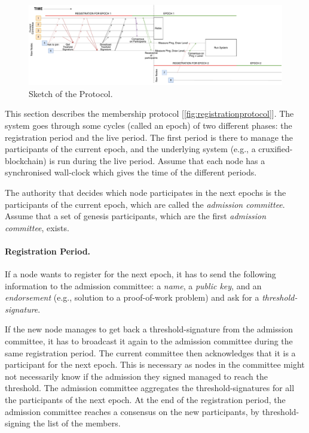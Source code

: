 \documentclass[a4paper,11pt,twoside,openright]{report}
\begin{document}
\begin{figure}
\centering
\includegraphics[width=700pt]{figures/Registrationprotocol}
\caption{Sketch of the Protocol.}
\label{fig:registrationprotocol}
\end{figure}

This section describes the membership protocol [\autoref{fig:registrationprotocol}].
The system goes through some cycles (called an epoch) of two different phases:
the registration period and the live period. The first period is there
to manage the participants of the current epoch, and the underlying system
(e.g., a cruxified-blockchain) is run during the live period. Assume
that each node has a synchronised wall-clock which gives the time of the
different periods.

The authority that decides which node participates in the next epochs is
the participants of the current epoch, which are called the \textit{admission
committee}. Assume that a set of genesis participants, which are the first
 \textit{admission committee}, exists.

\paragraph{Registration Period.}
If a node wants to register for the next epoch, it has to send the following
information to the admission committee: a \textit{name}, a \textit{public key}, and an
 \textit{endorsement} (e.g., solution to a proof-of-work problem) and ask for a
 \textit{threshold-signature}. 

If the new node manages to get back a threshold-signature from the admission
committee, it has to broadcast it again to the admission committee during the
same registration period. The current committee then acknowledges that it
is a participant for the next epoch. This is necessary as nodes in the
committee might not necessarily know if the admission they signed managed to
reach the threshold. The admission committee aggregates the
threshold-signatures for all the participants of the next epoch. At the end of
the registration period, the admission committee reaches a consensus on the
new participants, by threshold-signing the list of the members.  
\end{document}
